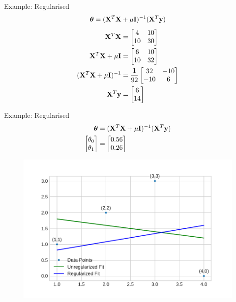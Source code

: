 \documentclass{beamer}
\begin{document}
\begin{frame}{Example: Regularised}
\[
\boldsymbol{\theta} = (\mathbf{X}^{T}\mathbf{X}+\mu \mathbf{I})^{-1}(\mathbf{X}^{T}\mathbf{y})
\]
\pause
\begin{align*}
\mathbf{X}^{T}\mathbf{X} &= \begin{bmatrix}
4 &10\\10&30
\end{bmatrix} \\
\mathbf{X}^{T}\mathbf{X}+\mu \mathbf{I} &= \begin{bmatrix}
6 &10\\10&32
\end{bmatrix} \\
(\mathbf{X}^{T}\mathbf{X}+\mu \mathbf{I})^{-1} &= \frac{1}{92} \begin{bmatrix}
32 & -10\\
-10& 6
\end{bmatrix}\\
\mathbf{X}^{T}\mathbf{y} &= \begin{bmatrix}
6\\
14
\end{bmatrix}
\end{align*}
\end{frame}

\begin{frame}{Example: Regularised}
\vspace{0.4cm}
\begin{align*}
\begin{split}
\boldsymbol{\theta} &= (\mathbf{X}^{T}\mathbf{X}+\mu \mathbf{I})^{-1}(\mathbf{X}^{T}\mathbf{y}) \\
\begin{bmatrix}
\theta_{0}\\
\theta_{1}
\end{bmatrix} &= 
\begin{bmatrix}
0.56\\
0.26
\end{bmatrix} 
\end{split}
\end{align*}
\vspace{-0.8cm}
\begin{figure}
\includegraphics[width=0.8\linewidth]{../assets/ridge-regression/figures/q_reg.pdf}
\end{figure}
\end{frame}
\end{document}
